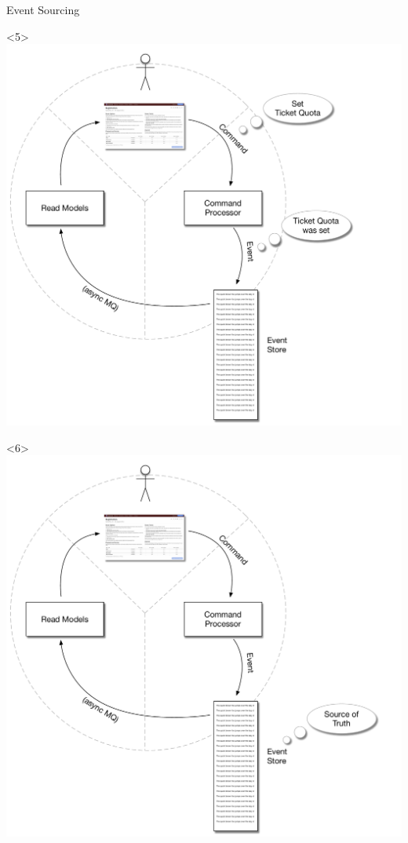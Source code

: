 \begin{frame}[fragile]{Event Sourcing}
\begin{onlyenv}
\end{onlyenv}
\begin{onlyenv}<5>
\includegraphics[width=\WIDTH]{../EventSourcing3.pdf} %
\end{onlyenv}
\begin{onlyenv}<6>
\includegraphics[width=\WIDTH]{../EventSourcing3_0.pdf} %

\end{onlyenv}
\end{frame}
